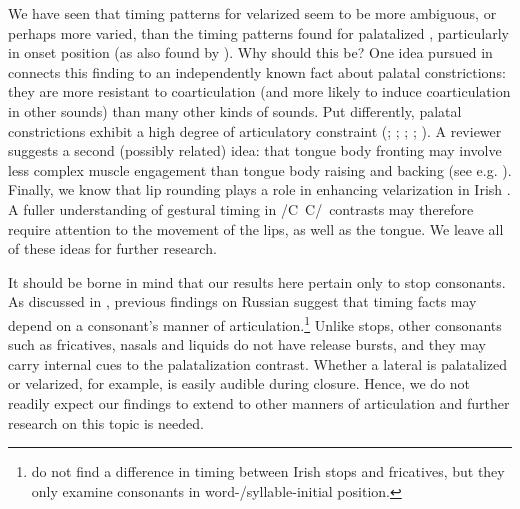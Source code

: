 \documentclass[output=paper,colorlinks,citecolor=brown]{langscibook}
\newcommand{\pal}{\ipa{ʲ}}
\newcommand{\vel}{\ipa{ˠ}}
\newcommand{\palvelcon}{/C\vel\ C\pal/}
\begin{document}
We have seen that timing patterns for velarized \ipa{/C\vel/} seem to be more ambiguous, or perhaps more varied, than the timing patterns found for palatalized \ipa{/C\pal/}, particularly in onset position (as also found by \citealt{Bennett_etal2018_Conamara_ultrasound}). Why should this be? One idea pursued in \citet{Bennett_etal2023_jphon_submission} connects this finding to an independently known fact about palatal constrictions: they are more resistant to coarticulation (and more likely to induce coarticulation in other sounds) than many other kinds of sounds. Put differently, palatal constrictions exhibit a high degree of articulatory constraint (\cite{Recasens_etal1997_lingual_coarticulation}; \cite{Recasens1999_lingual_coarticulation}; \cite{Recasens_Espinosa2009_coarticulatory_resistance}; \cite{Farnetani_Recasens2010_coarticulation}; \cite{Recasens_Rodriguez2016_coarticulation_ultrasound}). A reviewer suggests a second (possibly related) idea: that tongue body fronting may involve less complex muscle engagement than tongue body raising and backing (see e.g. \citealt[152--158]{Gick_etal2012_articulatory_phonetics_textbook}). Finally, we know that lip rounding plays a role in enhancing velarization in Irish \citep{Bennett_etal2019_Irish_contrast_enhance}. A fuller understanding of gestural timing in \palvelcon\ contrasts may therefore require attention to the movement of the lips, as well as the tongue. We leave all of these ideas for further research.

It should be borne in mind that our results here pertain only to stop consonants. As discussed in , previous findings on Russian suggest that timing facts may depend on a consonant's manner of articulation.\footnote{\citet{Bennett_etal2018_Conamara_ultrasound} do not find a difference in timing between Irish stops and fricatives, but they only examine consonants in word-/syllable-initial position.} Unlike stops, other consonants such as fricatives, nasals and liquids do not have release bursts, and they may carry internal cues to the palatalization contrast. Whether a lateral is palatalized or velarized, for example, is easily audible during closure. Hence, we do not readily expect our findings to extend to other manners of articulation and further research on this topic is needed.
\end{document}

